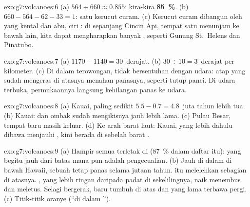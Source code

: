 \begin{solution}{exo:g7:volcanoes:6}
(a) $564 \div 660 \approx 0.855$: kira-kira \textbf{85~\%}. (b)
$660 - 564 - 62 - 33 = 1$: satu kerucut curam. (c) Kerucut curam dibangun
oleh  yang kental dan abu, ciri : di sepanjang Cincin
Api, tempat satu  menunjam ke bawah  lain, kita dapat
mengharapkan banyak , seperti  Gunung St.~Helens dan
Pinatubo.
\end{solution}

\begin{solution}{exo:g7:volcanoes:7}
(a) $1170 - 1140 = 30$~derajat. (b) $30 \div 10 = 3$~derajat per
kilometer. (c) Di dalam terowongan,  tidak bersentuhan dengan udara:
atap yang sudah mengeras di atasnya menahan panasnya, seperti tutup panci.
Di udara terbuka, permukaannya langsung kehilangan panas ke udara.
\end{solution}

\begin{solution}{exo:g7:volcanoes:8}
(a) Kauai, paling sedikit $5.5 - 0.7 = 4.8$~juta tahun lebih tua.
(b) Kauai:  dan ombak sudah mengikisnya jauh lebih lama. (c) Pulau
Besar, tempat  baru masih keluar. (d) Ke arah barat laut: Kauai, yang
lebih dahulu dibawa menjauhi , kini berada di sebelah barat
.
\end{solution}

\begin{solution}{exo:g7:volcanoes:9}
(a) Hampir semua  terletak di  (87~\% dalam daftar
itu):  yang begitu jauh dari batas mana pun adalah pengecualian.
(b) Jauh di dalam  di bawah Hawaii, sebuah  tetap panas
selama jutaan tahun.  itu melelehkan sebagian  di atasnya.
, yang lebih ringan daripada  padat di sekelilingnya, naik
menembus  dan meletus. Selagi  bergerak, 
baru tumbuh di atas  dan  yang lama terbawa
pergi. (c) Titik-titik oranye (``di dalam '').
\end{solution}

